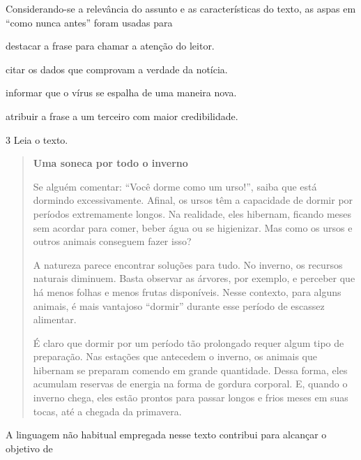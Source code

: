 Considerando-se a relevância do assunto e as características do texto,
as aspas em ``como nunca antes'' foram usadas para

\begin{escolha}

\item destacar a frase para chamar a atenção do leitor. 
\item citar os dados que comprovam a verdade da notícia.
\item informar que o vírus se espalha de uma maneira nova.
\item atribuir a frase a um terceiro com maior credibilidade.
\end{escolha}

\num{3} Leia o texto.

\begin{quote}
\centering\textbf{Uma soneca por todo o inverno}

Se alguém comentar: ``Você dorme como um urso!'', saiba que está
dormindo excessivamente. Afinal, os ursos têm a capacidade de dormir por
períodos extremamente longos. Na realidade, eles hibernam, ficando meses
sem acordar para comer, beber água ou se higienizar. Mas como os ursos e
outros animais conseguem fazer isso?

A natureza parece encontrar soluções para tudo. No inverno, os recursos
naturais diminuem. Basta observar as árvores, por exemplo, e perceber
que há menos folhas e menos frutas disponíveis. Nesse contexto, para
alguns animais, é mais vantajoso ``dormir'' durante esse período de
escassez alimentar.

É claro que dormir por um período tão prolongado requer algum tipo de
preparação. Nas estações que antecedem o inverno, os animais que
hibernam se preparam comendo em grande quantidade. Dessa forma, eles
acumulam reservas de energia na forma de gordura corporal. E, quando o
inverno chega, eles estão prontos para passar longos e frios meses em
suas tocas, até a chegada da primavera.

\end{quote}

A linguagem não habitual empregada nesse texto contribui para alcançar o
objetivo de

